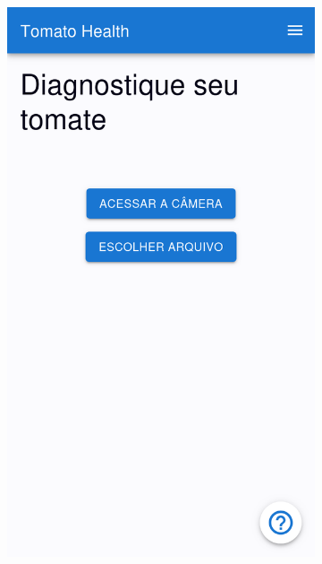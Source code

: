 \begin{figure}[htp]
\begin{subfigure}{0.3\textwidth}
    \end{subfigure}
    \begin{subfigure}{0.3\textwidth}
        \centering
        \includegraphics[width=\linewidth, height=0.4\textheight, keepaspectratio]{images/diagnostic3.png}
    \end{subfigure}
    \begin{subfigure}{0.3\textwidth}
        \centering

\end{subfigure}
\end{figure}
